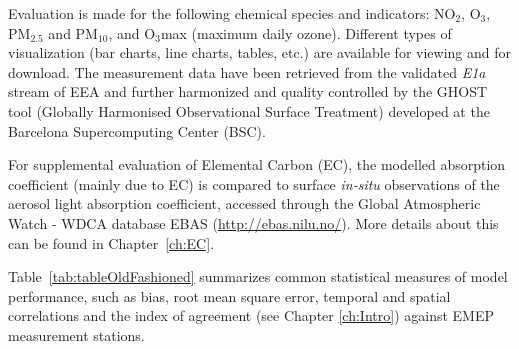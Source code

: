 Evaluation is made for the following chemical species and indicators:
NO$_{2}$, O$_{3}$, PM$_{2.5}$ and PM$_{10}$, and O$_{3}$max (maximum daily
ozone).
Different types of visualization (bar charts, line charts, tables,
etc.) are available for viewing and for download. The measurement data
have been retrieved from the validated {\em E1a} stream of EEA and further
harmonized and quality controlled by the GHOST tool (Globally Harmonised
Observational Surface Treatment) developed at the Barcelona Supercomputing
Center (BSC).

For supplemental evaluation of Elemental Carbon (EC), the modelled
absorption coefficient (mainly due to EC) is compared to surface \textit{in-situ}
observations of the aerosol light absorption coefficient, accessed through
the Global Atmospheric Watch - WDCA database EBAS
(\url{http://ebas.nilu.no/}). More details about this can be found in Chapter~\ref{ch:EC}.

\vspace{1cm}

Table~\ref{tab:tableOldFashioned} summarizes common statistical measures of model performance, such as bias, root mean square error, temporal and spatial correlations and the index of agreement (see Chapter \ref{ch:Intro}) against EMEP measurement stations.

